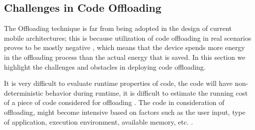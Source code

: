 \documentclass[12pt]{report}
\begin{document}
\begin{comment}
The engine  (linear
programming, fuzzy logic, Markov chains, etc.)
such that the engine can measure whether or not
the handset obtains a concrete benefit from
offloading to the cloud.  A mobile
offloads to the cloud in a transfer ratio that
depends on the size of the data and the available
bandwidth [4]. Usually, when code offloading is
counterproductive for the device, it is due to a
wrong inference process, which is inaccurate
based on the scope of observable parameters
that the system profilers can monitor [7].



In the code offloading model the mobile detects resource intensive portions of application, such that in
the presence of network communication, the mobile can estimate where the execution of code will require less computational effort (remote or local), which leads the device to save energy [9]. The code offloading model has been demonstrated to be ineffective in.


The evaluation of the code requires consideration of different aspects, for instance, what code to offload, when to offload, where to offload, how to offload, and so on \cite{flores2015mobile}.




The computation workload and communication requirement may change with
different execution instances. Optimal decisions on program
partitioning must be made at run time when sufficient in-
formation about workload and communication requirement
becomes available. \cite{wang2004parametric}
\end{comment}
\subsection{Challenges in Code Offloading}

The Offloading technique is far from being adopted in the design of current mobile architectures; this is because utilization of code offloading in real scenarios proves to be mostly negative \cite{flores2013mobile}, which means that the device spends
more energy in the offloading process than the actual energy that is saved. In this section we highlight the challenges and obstacles in deploying code offloading.

It is very difficult to evaluate runtime properties of code, the code will have non-deterministic behavior during runtime, it is difficult to estimate the running cost of a piece of code considered for offloading \cite{flores2015mobile}. The code in consideration of offloading, might become intensive based on factors such as the user input, type of application, execution environment, available memory, etc. \cite{flores2013mobile}.
\end{document}
